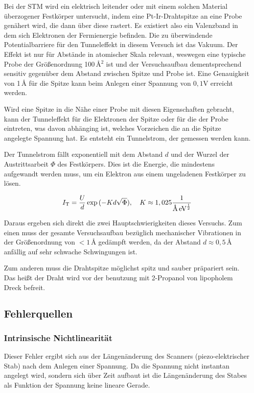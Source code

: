 \noindent Bei der STM wird ein elektrisch leitender oder mit einem solchen Material überzogener Festkörper untersucht, indem eine Pt-Ir-Drahtspitze an eine Probe genähert wird, die dann über diese rastert. Es existiert also ein Valenzband in dem sich Elektronen der Fermienergie befinden. Die zu überwindende Potentialbarriere für den Tunneleffekt in diesem Versuch ist das Vakuum. Der Effekt ist nur für Abstände in atomischer Skala relevant, weswegen eine typische Probe der Größenordnung 100\,\r{A}\(^2\) ist und der Versuchsaufbau dementsprechend sensitiv gegenüber dem Abstand zwischen Spitze und Probe ist. Eine Genauigkeit von 1\,\r{A} für die Spitze kann beim Anlegen einer Spannung von \(0,1\)V erreicht werden.

\noindent Wird eine Spitze in die Nähe einer Probe mit diesen Eigenschaften gebracht, kann der Tunneleffekt für die Elektronen der Spitze oder für die der Probe eintreten, was davon abhänging ist, welches Vorzeichen die an die Spitze angelegte Spannung hat. Es entsteht ein Tunnelstrom, der gemessen werden kann.

\noindent Der Tunnelstrom fällt exponentiell mit dem Abstand \(d\) und der Wurzel der Austrittsarbeit \(\Phi\) des Festkörpers. Dies ist die Energie, die mindestens aufgewandt werden muss, um ein Elektron aus einem ungeladenen Festkörper zu lösen. 

\begin{equation}
I_\text{T}=\frac{U}{d}\exp{(-Kd\sqrt{\Phi})},\quad K\approx1,025\frac{1}{\text{\r{A}}\,\text{eV}^\frac12}
\end{equation}

\noindent Daraus ergeben sich direkt die zwei Hauptschwierigkeiten dieses Versuchs. Zum einen muss der gesamte Versuchsaufbau bezüglich mechanischer Vibrationen in der Größenordnung von \(<1\)\,\r{A} gedämpft werden, da der Abstand \(d\approx0,5\)\,\r{A} anfällig auf sehr schwache Schwingungen ist.  

\noindent Zum anderen muss die Drahtspitze möglichst spitz und sauber präpariert sein. Das heißt der Draht wird vor der benutzung mit 2-Propanol von lipopholem Dreck befreit.

\subsection{Fehlerquellen}
\subsubsection{Intrinsische Nichtlinearität}
Dieser Fehler ergibt sich aus der Längenänderung des Scanners (piezo-elektrischer Stab) nach dem Anlegen einer Spannung. Da die Spannung nicht instantan angelegt wird, sondern sich über Zeit aufbaut ist die Längenänderung des Stabes als Funktion der Spannung keine lineare Gerade.

